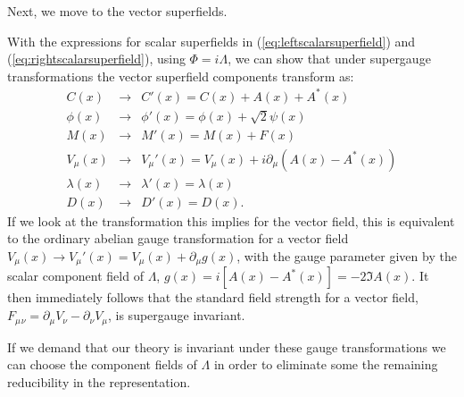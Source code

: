 \documentclass[notes.tex]{subfiles}
\begin{document}

Next, we move to the vector superfields.


With the expressions for scalar superfields in (\ref{eq:leftscalarsuperfield}) and (\ref{eq:rightscalarsuperfield}), using $\Phi=i\Lambda$, we can show that under supergauge transformations the vector superfield components transform as:
\begin{eqnarray}
C(x) &\to& C'(x) = C(x) + A(x) + A^*(x)\\
\phi(x) &\to& \phi'(x) = \phi(x) + \sqrt{2}\psi(x)\\
M(x) &\to& M'(x) = M(x) + F(x)\\
V_\mu(x) &\to& V_\mu'(x) = V_\mu(x) +i\partial_\mu(A(x) - A^*(x))\\
\lambda(x) &\to& \lambda'(x) = \lambda(x)\\
D(x) &\to& D'(x) = D(x). \label{eq:supergaugetrans_Dterm}
\end{eqnarray}
If we look at the transformation this implies for the vector field, this is equivalent to the ordinary abelian gauge transformation for a vector field  $V_\mu(x)\to V_\mu'(x) = V_\mu(x) +\partial_\mu g(x)$, with the gauge parameter given by the scalar component field of $\Lambda$, $g(x)=i[A(x) - A^*(x)]=-2\Im{A(x)}$. It then immediately follows that the standard field strength for a vector field, $F_\mu{}_\nu = \partial_\mu V_\nu - \partial_\nu V_\mu$, is supergauge invariant. 

If we demand that our theory is invariant under these gauge transformations we can choose the component fields of $\Lambda$ in order to eliminate some the remaining reducibility  in the representation. 
\end{document}
